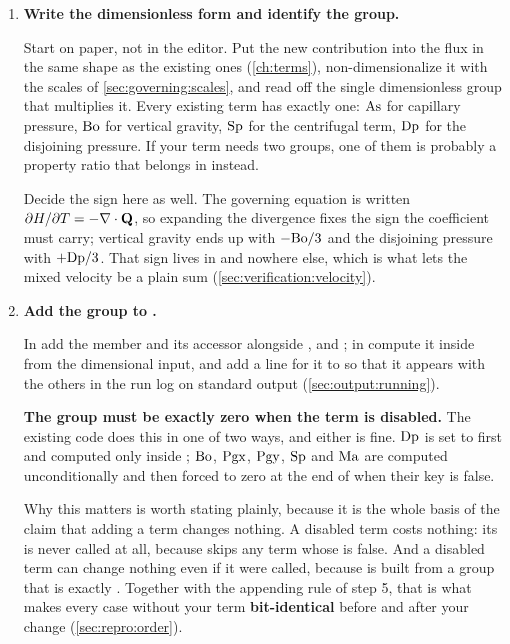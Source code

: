 \begin{enumerate}

\item \textbf{Write the dimensionless form and identify the group.}

Start on paper, not in the editor. Put the new contribution into the flux in
the same shape as the existing ones (\cref{ch:terms}), non-dimensionalize it
with the scales of \cref{sec:governing:scales}, and read off the single
dimensionless group that multiplies it. Every existing term has exactly one:
$\mathrm{As}$ for capillary pressure, $\mathrm{Bo}$ for vertical gravity, $\mathrm{Sp}$ for the
centrifugal term, $\mathrm{Dp}$ for the disjoining pressure. If your term needs two
groups, one of them is probably a property ratio that belongs in
 instead.

Decide the sign here as well. The governing equation is written
$\partial H/\partial T = -\nabla\cdot\mathbf{Q}$, so expanding the divergence fixes
the sign the coefficient must carry; vertical gravity ends up with
$-\mathrm{Bo}/3$ and the disjoining pressure with $+\mathrm{Dp}/3$. That sign lives in
 and nowhere else, which is what lets the mixed velocity be a
plain sum (\cref{sec:verification:velocity}).

\item \textbf{Add the group to .}

In  add the member and its
accessor alongside ,  and ; in
 compute it inside  from the
dimensional input, and add a line for it to  so that it
appears with the others in the run log on standard output
(\cref{sec:output:running}).

\textbf{The group must be exactly zero when the term is disabled.} The existing
code does this in one of two ways, and either is fine. $\mathrm{Dp}$ is set to
 first and computed only inside ; $\mathrm{Bo}$, $\mathrm{Pgx}$, $\mathrm{Pgy}$, $\mathrm{Sp}$ and $\mathrm{Ma}$ are
computed unconditionally and then forced to zero at the end of 
when their  key is false.

Why this matters is worth stating plainly, because it is the whole basis of the
claim that adding a term changes nothing. A disabled term costs nothing: its
 is never called at all, because
 skips any term whose  is
false. And a disabled term can change nothing even if it were called, because
 is built from a group that is exactly . Together with
the appending rule of step 5, that is what makes every case without your term
\textbf{bit-identical} before and after your change
(\cref{sec:repro:order}).


\end{enumerate}
